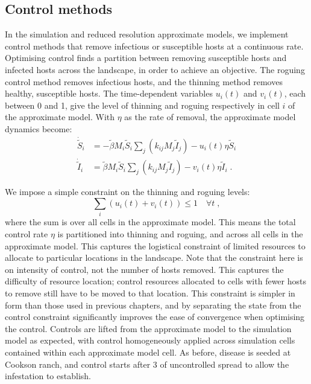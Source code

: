 \subsection{Control methods}

In the simulation and reduced resolution approximate models, we implement control methods that remove infectious or susceptible hosts at a continuous rate. Optimising control finds a partition between removing susceptible hosts and infected hosts across the landscape, in order to achieve an objective. The roguing control method removes infectious hosts, and the thinning method removes healthy, susceptible hosts. The time-dependent variables $u_i(t)$ and $v_i(t)$, each between 0 and 1, give the level of thinning and roguing respectively in cell $i$ of the approximate model. With $\eta$ as the rate of removal, the approximate model dynamics become:
\begin{subequations}
    \begin{align}
        \dot{\tilde{S}}_i &= -\tilde{\beta}M_i\tilde{S}_i\sum_j\left(k_{ij}M_j\tilde{I}_j\right) - u_i(t)\eta{}\tilde{S}_i\\
        \dot{\tilde{I}}_i &= \tilde{\beta}M_i\tilde{S}_i\sum_j\left(k_{ij}M_j\tilde{I}_j\right) - v_i(t)\eta{}\tilde{I}_i\;.
    \end{align}
\end{subequations}

We impose a simple constraint on the thinning and roguing levels:
\begin{equation}
    \sum_i\left(u_i(t) + v_i(t)\right) \leq 1 \quad \forall t\;,
\end{equation}
where the sum is over all cells in the approximate model. This means the total control rate $\eta$ is partitioned into thinning and roguing, and across all cells in the approximate model. This captures the logistical constraint of limited resources to allocate to particular locations in the landscape. Note that the constraint here is on intensity of control, not the number of hosts removed. This captures the difficulty of resource location; control resources allocated to cells with fewer hosts to remove still have to be moved to that location. This constraint is simpler in form than those used in previous chapters, and by separating the state from the control constraint significantly improves the ease of convergence when optimising the control. Controls are lifted from the approximate model to the simulation model as expected, with control homogeneously applied across simulation cells contained within each approximate model cell. As before, disease is seeded at Cookson ranch, and control starts after \SI{3}{\years} of uncontrolled spread to allow the infestation to establish.

